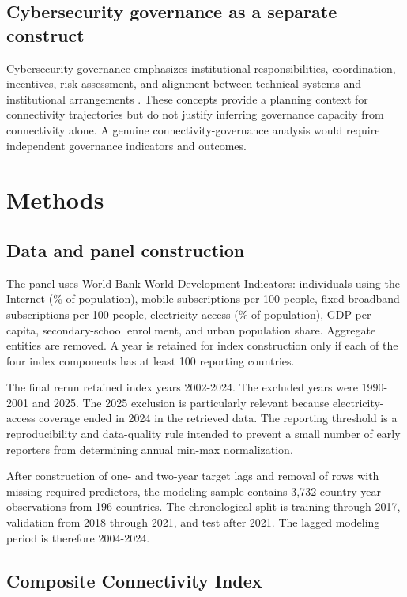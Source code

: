 \documentclass[conference]{IEEEtran}
\begin{document}
\subsection{Cybersecurity governance as a separate construct}

Cybersecurity governance emphasizes institutional responsibilities, coordination, incentives, risk assessment, and alignment between technical systems and institutional arrangements \cite{agbodoh,zhang,kamariotou}. These concepts provide a planning context for connectivity trajectories but do not justify inferring governance capacity from connectivity alone. A genuine connectivity-governance analysis would require independent governance indicators and outcomes.

\section{Methods}

\subsection{Data and panel construction}

The panel uses World Bank World Development Indicators: individuals using the Internet (\% of population), mobile subscriptions per 100 people, fixed broadband subscriptions per 100 people, electricity access (\% of population), GDP per capita, secondary-school enrollment, and urban population share. Aggregate entities are removed. A year is retained for index construction only if each of the four index components has at least 100 reporting countries.

The final rerun retained index years 2002-2024. The excluded years were 1990-2001 and 2025. The 2025 exclusion is particularly relevant because electricity-access coverage ended in 2024 in the retrieved data. The reporting threshold is a reproducibility and data-quality rule intended to prevent a small number of early reporters from determining annual min-max normalization.

After construction of one- and two-year target lags and removal of rows with missing required predictors, the modeling sample contains 3,732 country-year observations from 196 countries. The chronological split is training through 2017, validation from 2018 through 2021, and test after 2021. The lagged modeling period is therefore 2004-2024.

\subsection{Composite Connectivity Index}
\end{document}
